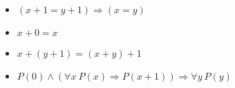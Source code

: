 \begin{frame}
\begin{itemize}
\begin{itemize}
\item $(x + 1 = y + 1) \Rightarrow (x = y)$

\item $x + 0 = x$

\item $x + (y + 1) = (x + y) + 1$

\item $P(0) \wedge (\forall x~P(x) \Rightarrow P(x + 1)) \Rightarrow \forall y~P(y)$

\end{itemize}

\end{itemize}

\end{frame}
